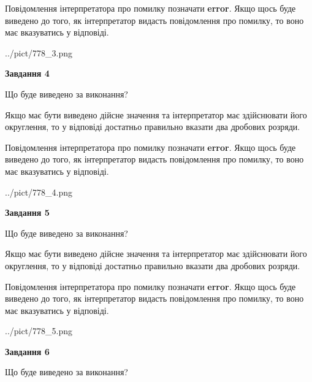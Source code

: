 \documentclass[12pt, ukrainian]{article}
\begin{document}
{\begin {Large}
Повідомлення інтерпретатора про помилку позначати \textbf{error}.
Якщо щось буде виведено до того, як інтерпретатор видасть повідомлення про помилку, 
то воно має вказуватись у відповіді. \par

\begin{center}
	{../pict/778_3.png}
\end{center}
\newpage

{\begin {center}\textbf{Завдання 4}\end {center}}\par
Що буде виведено за виконання? \par

Якщо має бути виведено дійсне значення та інтерпретатор має здійснювати його округлення, 
то у відповіді достатньо правильно вказати два дробових розряди.

Повідомлення інтерпретатора про помилку позначати \textbf{error}.
Якщо щось буде виведено до того, як інтерпретатор видасть повідомлення про помилку, 
то воно має вказуватись у відповіді. \par

\begin{center}
	{../pict/778_4.png}
\end{center}
\newpage

{\begin {center}\textbf{Завдання 5}\end {center}}\par
Що буде виведено за виконання? \par

Якщо має бути виведено дійсне значення та інтерпретатор має здійснювати його округлення, 
то у відповіді достатньо правильно вказати два дробових розряди.

Повідомлення інтерпретатора про помилку позначати \textbf{error}.
Якщо щось буде виведено до того, як інтерпретатор видасть повідомлення про помилку, 
то воно має вказуватись у відповіді. \par

\begin{center}
	{../pict/778_5.png}
\end{center}
\newpage

{\begin {center}\textbf{Завдання 6}\end {center}}\par
Що буде виведено за виконання? \par


\end{Large}}
\end{document}

